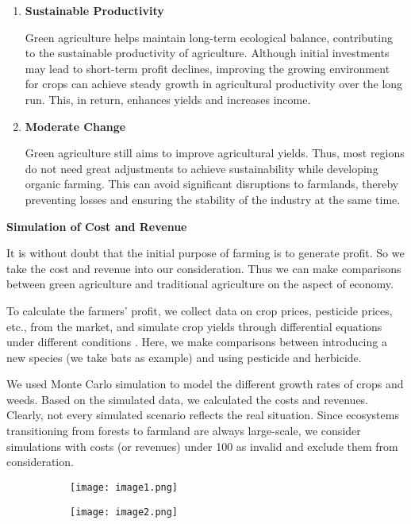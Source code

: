 \documentclass[12pt]{article}  %
\begin{document}
\begin{enumerate}
    \item \textbf{Sustainable Productivity}
    
    Green agriculture helps maintain long-term ecological balance, contributing to the sustainable productivity of agriculture. Although initial investments may lead to short-term profit declines, improving the growing environment for crops can achieve steady growth in agricultural productivity over the long run. This, in return, enhances yields and increases income.
    \item \textbf{Moderate Change}
    
    Green agriculture still aims to improve agricultural yields. Thus, most regions do not need great adjustments to achieve sustainability while developing organic farming. This can avoid significant disruptions to farmlands, thereby preventing losses and ensuring the stability of the industry at the same time.

    \end{enumerate}
    \noindent\textbf{Simulation of Cost and Revenue}
    
    It is without doubt that the initial purpose of farming is to generate profit. So we take the cost and revenue into our consideration. Thus we can make comparisons between green agriculture and traditional agriculture on the aspect of economy.

    To calculate the farmers' profit, we collect data on crop prices, pesticide prices, etc., from the market, and simulate crop yields through differential equations under  different conditions . Here, we make comparisons between introducing a new species (we take bats as example) and using pesticide and herbicide.

    We used Monte Carlo simulation to model the different growth rates of crops and weeds. Based on the simulated data, we calculated the costs and revenues. Clearly, not every simulated scenario reflects the real situation. Since ecosystems transitioning from forests to farmland are always large-scale, we consider simulations with costs (or revenues) under 100 as invalid and exclude them from consideration.
    \begin{figure}[h]
        \centering
        \begin{subfigure}[b]{.4\textwidth}
            \texttt{[image: image1.png]}
        \end{subfigure}
        \begin{subfigure}[b]{.4\textwidth}
            \texttt{[image: image2.png]}
        \end{subfigure}
    \end{figure}
\end{document}
